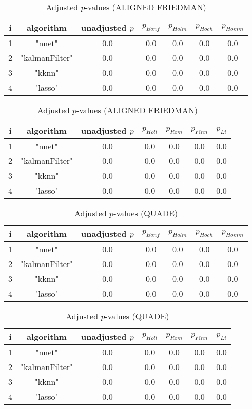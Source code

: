 \documentclass[a4paper,10pt]{article}
\begin{document}
\begin{landscape}
\newpage

\begin{table}[!htp]
\centering\scriptsize
\caption{Adjusted $p$-values (ALIGNED FRIEDMAN)}
\begin{tabular}{ccccccc}
i&algorithm&unadjusted $p$&$p_{Bonf}$&$p_{Holm}$&$p_{Hoch}$&$p_{Homm}$\\
\hline
1&"nnet"&0.0&0.0&0.0&0.0&0.0\\
2&"kalmanFilter"&0.0&0.0&0.0&0.0&0.0\\
3&"kknn"&0.0&0.0&0.0&0.0&0.0\\
4&"lasso"&0.0&0.0&0.0&0.0&0.0\\
\hline
\end{tabular}
\end{table}

\begin{table}[!htp]
\centering\scriptsize
\caption{Adjusted $p$-values (ALIGNED FRIEDMAN)}
\begin{tabular}{ccccccc}
i&algorithm&unadjusted $p$&$p_{Holl}$&$p_{Rom}$&$p_{Finn}$&$p_{Li}$\\
\hline
1&"nnet"&0.0&0.0&0.0&0.0&0.0\\
2&"kalmanFilter"&0.0&0.0&0.0&0.0&0.0\\
3&"kknn"&0.0&0.0&0.0&0.0&0.0\\
4&"lasso"&0.0&0.0&0.0&0.0&0.0\\
\hline
\end{tabular}
\end{table}


\newpage

\begin{table}[!htp]
\centering\scriptsize
\caption{Adjusted $p$-values (QUADE)}
\begin{tabular}{ccccccc}
i&algorithm&unadjusted $p$&$p_{Bonf}$&$p_{Holm}$&$p_{Hoch}$&$p_{Homm}$\\
\hline
1&"nnet"&0.0&0.0&0.0&0.0&0.0\\
2&"kalmanFilter"&0.0&0.0&0.0&0.0&0.0\\
3&"kknn"&0.0&0.0&0.0&0.0&0.0\\
4&"lasso"&0.0&0.0&0.0&0.0&0.0\\
\hline
\end{tabular}
\end{table}

\begin{table}[!htp]
\centering\scriptsize
\caption{Adjusted $p$-values (QUADE)}
\begin{tabular}{ccccccc}
i&algorithm&unadjusted $p$&$p_{Holl}$&$p_{Rom}$&$p_{Finn}$&$p_{Li}$\\
\hline
1&"nnet"&0.0&0.0&0.0&0.0&0.0\\
2&"kalmanFilter"&0.0&0.0&0.0&0.0&0.0\\
3&"kknn"&0.0&0.0&0.0&0.0&0.0\\
4&"lasso"&0.0&0.0&0.0&0.0&0.0\\
\hline
\end{tabular}
\end{table}

\end{landscape}
\end{document}
